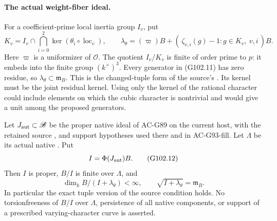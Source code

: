 \paragraph{The actual weight-fiber ideal.}
For a coefficient-prime local inertia group $I_v$, put
\[
 K_v=I_v\cap\bigcap_{i=0}^{2}
                  \ker(\theta_i\circ\operatorname{loc}_v),
 \qquad
 \lambda_\theta=(\varpi)B+
  (\,\zeta_{v,i}(g)-1:g\in K_v,\ v,i\,)B.
\tag{G102.11}
\]
Here $\varpi$ is a uniformizer of $\mathcal O$.
The quotient $I_v/K_v$ is finite of order prime to $p$:
it embeds into the finite group $(k^\times)^3$.
Every generator in (G102.11) has zero residue, so
$\lambda_\theta\subset\mathfrak m_B$.
This is the changed-tuple form of the source's
.  Its kernel must be the joint residual
kernel.  Using only the kernel of the rational character
could include elements on which the cubic character is
nontrivial and would give a unit among the proposed generators.

\begin{theorem}
\label{thm:ACG102finlam}
Let $J_{\rm aut}\subset\mathscr B$ be the proper native ideal
of AC-G89 on the current host, with the retained source
,  and support hypotheses used there
and in AC-G93-fill.  Let $\Lambda$ be its actual native
.  Put
\[
                        I=\Phi(J_{\rm aut})B.
\tag{G102.12}
\]
Then $I$ is proper, $B/I$ is finite over $\Lambda$, and
\[
 \dim_k B/(I+\lambda_\theta)<\infty,
 \qquad \sqrt{I+\lambda_\theta}=\mathfrak m_B.
\tag{G102.13}
\]
In particular the exact tuple version of the source
 condition holds.
No torsionfreeness of $B/I$ over $\Lambda$, persistence of
all native components, or support of a prescribed
varying-character curve is asserted.
\end{theorem}

